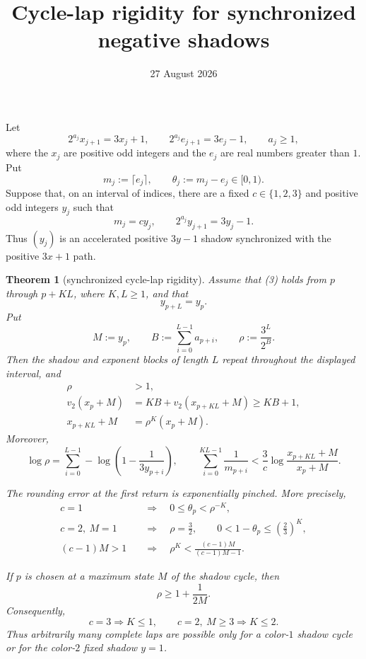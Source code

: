 \documentclass[11pt]{article}
\title{Cycle-lap rigidity for synchronized negative shadows}
\author{}
\date{27 August 2026}
\newtheorem{theorem}{Theorem}
\begin{document}
\maketitle

Let
\[
  2^{a_j}x_{j+1}=3x_j+1,
  \qquad
  2^{a_j}e_{j+1}=3e_j-1,
  \qquad a_j\geq1,
  \tag{1}
\]
where the $x_j$ are positive odd integers and the $e_j$ are real numbers
greater than $1$.  Put
\[
  m_j:=\lceil e_j\rceil,
  \qquad
  \theta_j:=m_j-e_j\in[0,1).
  \tag{2}
\]
Suppose that, on an interval of indices, there are a fixed
$c\in\{1,2,3\}$ and positive odd integers $y_j$ such that
\[
  m_j=cy_j,
  \qquad
  2^{a_j}y_{j+1}=3y_j-1.
  \tag{3}
\]
Thus $(y_j)$ is an accelerated positive $3y-1$ shadow synchronized with
the positive $3x+1$ path.

\begin{theorem}[synchronized cycle-lap rigidity]
Assume that (3) holds from $p$ through $p+KL$, where $K,L\geq1$, and that
\[
  y_{p+L}=y_p.
  \tag{4}
\]
Put
\[
  M:=y_p,
  \qquad
  B:=\sum_{i=0}^{L-1}a_{p+i},
  \qquad
  \rho:=\frac{3^L}{2^B}.
  \tag{5}
\]
Then the shadow and exponent blocks of length $L$ repeat throughout the
displayed interval, and
\[
\boxed{\begin{aligned}
  \rho&>1,\\
  v_2(x_p+M)&=KB+v_2(x_{p+KL}+M)\geq KB+1,\\
  x_{p+KL}+M&=\rho^K(x_p+M).
\end{aligned}}
\tag{6}
\]
Moreover,
\[
\boxed{
  \log\rho
  =\sum_{i=0}^{L-1}
    -\log\left(1-\frac1{3y_{p+i}}\right),
  \qquad
  \sum_{i=0}^{KL-1}\frac1{m_{p+i}}
  <\frac3c\log\frac{x_{p+KL}+M}{x_p+M}.}
\tag{7}
\]

The rounding error at the first return is exponentially pinched.  More
precisely,
\[
\boxed{
\begin{aligned}
  c=1&\quad\Longrightarrow\quad
    0\leq\theta_p<\rho^{-K},\\
  c=2,\ M=1&\quad\Longrightarrow\quad
    \rho=\frac32,
    \qquad 0<1-\theta_p\leq\left(\frac23\right)^K,\\
  (c-1)M>1&\quad\Longrightarrow\quad
    \rho^K<\frac{(c-1)M}{(c-1)M-1}.
\end{aligned}}
\tag{8}
\]

If $p$ is chosen at a maximum state $M$ of the shadow cycle, then
\[
  \rho\geq1+\frac1{2M}.
  \tag{9}
\]
Consequently,
\[
\boxed{
  c=3\Longrightarrow K\leq1,
  \qquad
  c=2,\ M\geq3\Longrightarrow K\leq2.}
\tag{10}
\]
Thus arbitrarily many complete laps are possible only for a color-$1$
shadow cycle or for the color-$2$ fixed shadow $y=1$.
\end{theorem}
\end{document}
